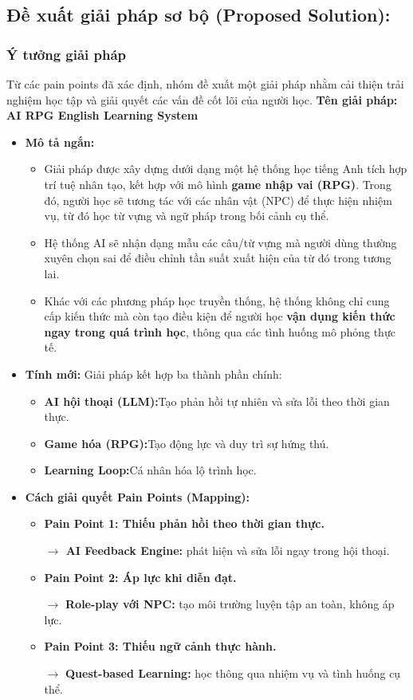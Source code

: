 \subsection{Đề xuất giải pháp sơ bộ (Proposed Solution):}
\subsubsection{Ý tưởng giải pháp}
Từ các pain points đã xác định, nhóm đề xuất một giải pháp nhằm cải thiện trải nghiệm học tập và giải quyết các vấn đề cốt lõi của người học.
\textbf{Tên giải pháp: AI RPG English Learning System}
\begin{itemize}[label=-]
\item \textbf{Mô tả ngắn:} 
\begin{itemize}[label=+]
\item Giải pháp được xây dựng dưới dạng một hệ thống học tiếng Anh tích hợp trí tuệ nhân tạo, kết hợp với mô hình \textbf{game nhập vai (RPG)}. Trong đó, người học sẽ tương tác với các nhân vật (NPC) để thực hiện nhiệm vụ, từ đó học từ vựng và ngữ pháp trong bối cảnh cụ thể.
\item Hệ thống AI sẽ nhận dạng mẫu các câu/từ vựng mà người dùng thường xuyên chọn sai để điều chỉnh tần suất xuất hiện của từ đó trong tương lai.
\item Khác với các phương pháp học truyền thống, hệ thống không chỉ cung cấp kiến thức mà còn tạo điều kiện để người học \textbf{vận dụng kiến thức ngay trong quá trình học}, thông qua các tình huống mô phỏng thực tế.
\end{itemize}
\item \textbf{Tính mới:} Giải pháp kết hợp ba thành phần chính:
\begin{itemize}[label=+]
\item \textbf{AI hội thoại (LLM):}Tạo phản hồi tự nhiên và sửa lỗi theo thời gian thực.
\item \textbf{Game hóa (RPG):}Tạo động lực và duy trì sự hứng thú.
\item \textbf{Learning Loop:}Cá nhân hóa lộ trình học.
\end{itemize}

\item \textbf{Cách giải quyết Pain Points (Mapping):}
\begin{itemize}[label=+]
\item \textbf{Pain Point 1: Thiếu phản hồi theo thời gian thực.}

\textbf{$\rightarrow$ AI Feedback Engine:} phát hiện và sửa lỗi ngay trong hội thoại.
\item \textbf{Pain Point 2: Áp lực khi diễn đạt.}

$\rightarrow$ \textbf{Role-play với NPC:} tạo môi trường luyện tập an toàn, không áp lực.
\item \textbf{Pain Point 3: Thiếu ngữ cảnh thực hành.}

$\rightarrow$ \textbf{Quest-based Learning:} học thông qua nhiệm vụ và tình huống cụ thể.
\end{itemize}
\end{itemize}
